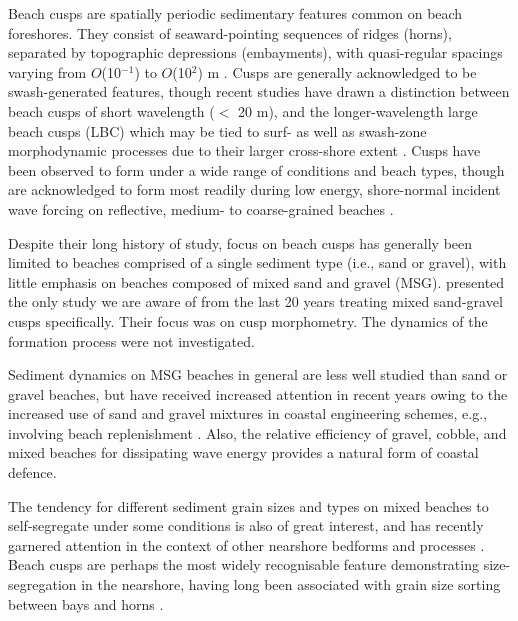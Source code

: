 Beach cusps are spatially periodic sedimentary features common on beach foreshores. They consist of seaward-pointing sequences of ridges (horns), separated by topographic depressions (embayments), with quasi-regular spacings varying from $O$(10$^{-1}$) to $O$(10$^{2}$) m \citep{Coco_etal1999}. Cusps are generally acknowledged to be swash-generated features, though recent studies have drawn a distinction between beach cusps of short wavelength ($<$ 20 m), and the longer-wavelength large beach cusps (LBC) which may be tied to surf- as well as swash-zone morphodynamic processes due to their larger cross-shore extent \citep{Garnier_etal2010}. Cusps have been observed to form under a wide range of conditions and beach types, though are acknowledged to form most readily during low energy, shore-normal incident wave forcing on reflective, medium- to coarse-grained beaches \citep{Holland1998}. 

Despite their long history of study, focus on beach cusps has generally been limited to beaches comprised of a single sediment type (i.e., sand or gravel), with little emphasis on beaches composed of mixed sand and gravel (MSG). \citet{Nolan_etal1999} presented the only study we are aware of from the last 20 years treating mixed sand-gravel cusps specifically. Their focus was on cusp morphometry. The dynamics of the formation process were not investigated. 

Sediment dynamics on MSG beaches in general are less well studied than sand or gravel beaches, but have received increased attention in recent years owing to the increased use of sand and gravel mixtures in coastal engineering schemes, e.g., involving beach replenishment \citep{Mason_Coates2001}. Also, the relative efficiency of gravel, cobble, and mixed beaches for dissipating wave energy provides a natural form of coastal defence. 

The tendency for different sediment grain sizes and types on mixed beaches to self-segregate under some conditions is also of great interest, and has recently garnered attention in the context of other nearshore bedforms and processes \citep[e.g.,][]{Murray_Thieler2004, vanOyen_etal2010, Hay_etal2014}. Beach cusps are perhaps the most widely recognisable feature demonstrating size-segregation in the nearshore, having long been associated with grain size sorting between bays and horns \citep[e.g.,][]{LonguetHiggins_Parkin1962}. 


